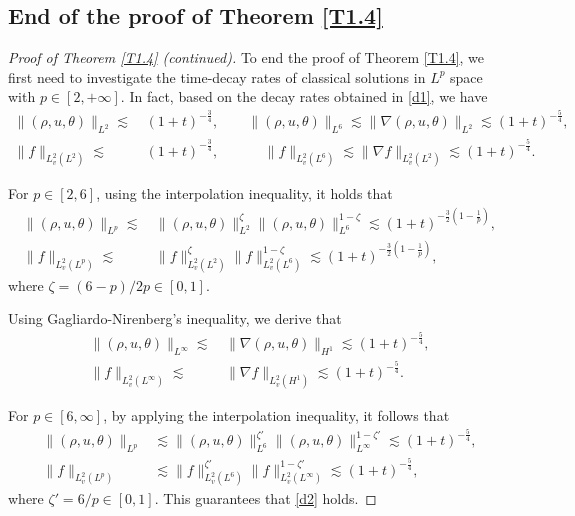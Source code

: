 \documentclass[reqno,11pt]{amsart}
\theoremstyle{plain}
\numberwithin{equation}{section}
\begin{document}
\subsection{End of the proof of  Theorem \ref{T1.4}}
\begin{proof}[Proof of Theorem \ref{T1.4} \emph{(}continued\emph{)}]
To end the proof of  Theorem \ref{T1.4},  we first need to investigate  
the  time-decay rates of classical solutions in $L^p$ space with  $p\in [2,+\infty]$. In fact, 
based on the decay rates obtained in   \eqref{d1}, we have 
\begin{align*}
\|(\rho,u,\theta)\|_{L^2}\lesssim \,& (1+t)^{-\frac{3}{4}}, \qquad
 \|(\rho,u,\theta)\|_{L^6}\lesssim   \|\nabla(\rho,u,\theta)\|_{L^2}\lesssim (1+t)^{-\frac{5}{4}},   \\
 \|f\|_{L_v^2(L^{2})}\lesssim \,&  (1+t)^{-\frac{3}{4}},\qquad\quad\, 
 \| f\|_{L_v^2(L^{6})}\lesssim    \|\nabla f\|_{L_v^2(L^{2})}\lesssim (1+t)^{-\frac{5}{4}}.      
\end{align*}

For $p\in [2,6]$, using the interpolation inequality, it holds that
\begin{align*}
 \|(\rho,u,\theta)\|_{L^p}\lesssim \,
 &  \|(\rho,u,\theta)\|_{L^2}^{\zeta}\|(\rho,u,\theta)\|_{L^6}^{{1-\zeta}}
 \lesssim  (1+t)^{-\frac{3}{2}(1-\frac{1}{p})} , \\
 \|f\|_{L_v^2(L^{p})}\lesssim \,&  
 \|f\|_{L_v^2(L^{2})}^{\zeta}\|f\|_{L_v^2(L^{6})}^{{1-\zeta}}\lesssim  (1+t)^{-\frac{3}{2}(1-\frac{1}{p})},
\end{align*}
where $\zeta= ({6-p})/ {2p} \in [0,1]$.

Using   Gagliardo-Nirenberg's inequality, we derive  that
\begin{align*} 
\|(\rho,u,\theta)\|_{L^{\infty}} \lesssim \,& \|\nabla(\rho,u,\theta)\|_{H^{1}} 
\lesssim (1+t)^{-\frac{5}{4}}, \\ 
\|f\|_{L_v^2(L^{\infty})} \lesssim \,& \|\nabla f\|_{L_v^2(H^{1})} 
\lesssim (1+t)^{-\frac{5}{4}}. 
\end{align*}  

For $p \in [6,\infty]$, by applying the interpolation inequality, it follows that  
\begin{align*} 
\|(\rho,u,\theta)\|_{L^p} &\lesssim \|(\rho,u,\theta)\|_{L^6}^{\zeta'} 
\|(\rho,u,\theta)\|_{L^{\infty}}^{1-\zeta'} \lesssim (1+t)^{-\frac{5}{4}}, \\ 
\|f\|_{L_v^2(L ^{p})} &\lesssim \|f\|_{L_v^2(L ^{6})}^{\zeta'} 
\|f\|_{L_v^2(L ^{\infty})}^{1-\zeta'} \lesssim (1+t)^{-\frac{5}{4}}, 
\end{align*}  
where $\zeta' = {6}/{p} \in [0,1]$. This guarantees that \eqref{d2} holds.


\end{proof}
\end{document}
